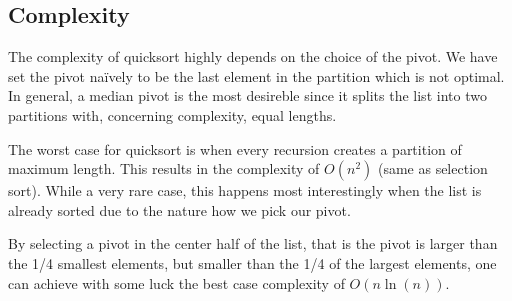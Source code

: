 \subsection{Complexity}


The complexity of quicksort highly depends on the choice of the pivot. We have set the pivot naïvely to be the last element in the partition which is not optimal. In general, a median pivot is the most desireble since it splits the list into two partitions with, concerning complexity, equal lengths.

The worst case for quicksort is when every recursion creates a partition of maximum length. This results in the complexity of \(O(n^2)\) (same as selection sort). While a very rare case, this happens most interestingly when the list is already sorted due to the nature how we pick our pivot.

By selecting a pivot in the center half of the list, that is the pivot is larger than the 1/4 smallest elements, but smaller than the 1/4 of the largest elements, one can achieve with some luck the best case complexity of \(O(n \ln(n))\).\cite[p.~137]{bib:thealgorithmdesignmanual} 